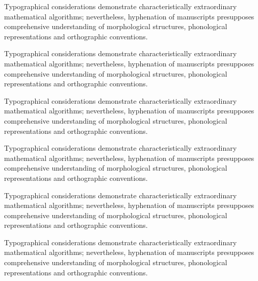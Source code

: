 \vsize=2in \hsize=3in 
\def\para{Typographical considerations demonstrate characteristically
extraordinary mathematical algorithms; nevertheless, hyphenation of
manuscripts presupposes comprehensive understanding of morphological
structures, phonological representations and orthographic conventions.
\par}
\para\para\para\para\para\para
\bye
